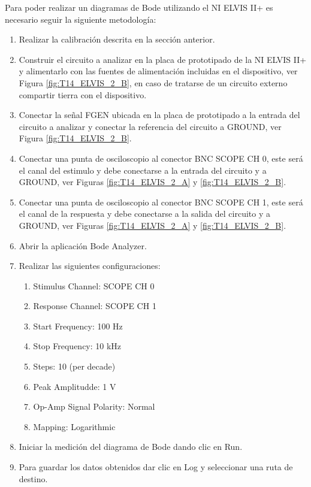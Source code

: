 	Para poder realizar un diagramas de Bode utilizando el NI ELVIS II+ es necesario seguir la siguiente metodología:
		
		\begin{enumerate}
			\item Realizar la calibración descrita en la sección anterior.
			\item Construir el circuito a analizar en la placa de prototipado de la NI ELVIS II+ y alimentarlo con las fuentes de alimentación incluidas en el dispositivo, ver Figura \ref{fig:T14_ELVIS_2_B}, en caso de tratarse de un circuito externo compartir tierra con el dispositivo. 
			\item Conectar la señal FGEN ubicada en la placa de prototipado a la entrada del circuito a analizar y conectar la referencia del circuito a GROUND, ver Figura \ref{fig:T14_ELVIS_2_B}.
			\item Conectar una punta de osciloscopio al conector BNC SCOPE CH 0, este será el canal del estimulo y debe conectarse a la entrada del circuito y a GROUND, ver Figuras \ref{fig:T14_ELVIS_2_A} y \ref{fig:T14_ELVIS_2_B}.
			\item Conectar una punta de osciloscopio al conector BNC SCOPE CH 1, este será el canal de la respuesta y debe conectarse a la salida del circuito y a GROUND, ver Figuras \ref{fig:T14_ELVIS_2_A} y \ref{fig:T14_ELVIS_2_B}.
			\item Abrir la aplicación Bode Analyzer.
			\item Realizar las siguientes configuraciones:
				\begin{multicols}{2}
				    \begin{enumerate}
				    	\item Stimulus Channel: SCOPE CH 0
						\item Response Channel: SCOPE CH 1 
						\item Start Frequency:	100 Hz
						\item Stop Frequency:	10 kHz
						\item Steps:			10 (per decade)
						\item Peak Amplitudde:	1 V
						\item Op-Amp Signal Polarity: Normal
						\item Mapping:			Logarithmic
				    \end{enumerate}
			    \end{multicols}
		    \item Iniciar la medición del diagrama de Bode dando clic en Run.
		    \item Para guardar los datos obtenidos dar clic en Log y seleccionar una ruta de destino.
		\end{enumerate}
	
